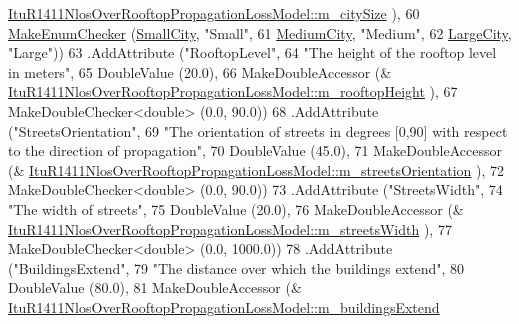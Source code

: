 \begin{DoxyCode}
      \hyperlink{classns3_1_1ItuR1411NlosOverRooftopPropagationLossModel_a875ce5ba78aa17e94efc01cc4290e299}{ItuR1411NlosOverRooftopPropagationLossModel::m\_citySize}
      ),
60                    \hyperlink{namespacens3_a48832781a2b521d3d0091e05ece30615}{MakeEnumChecker} (\hyperlink{group__propagation_gga29c9a1b1a58b6a56054ff5ea4c5a574dad3f856f2f166ae12798befabfbd2c99e}{SmallCity}, \textcolor{stringliteral}{"Small"},
61                                     \hyperlink{group__propagation_gga29c9a1b1a58b6a56054ff5ea4c5a574dad922b499b70e978a03d2230093e4aacd}{MediumCity}, \textcolor{stringliteral}{"Medium"},
62                                     \hyperlink{group__propagation_gga29c9a1b1a58b6a56054ff5ea4c5a574da017d6be2af0a102a6147e6519d63f54c}{LargeCity}, \textcolor{stringliteral}{"Large"}))
63     .AddAttribute (\textcolor{stringliteral}{"RooftopLevel"},
64                    \textcolor{stringliteral}{"The height of the rooftop level in meters"},
65                    DoubleValue (20.0),
66                    MakeDoubleAccessor (&
      \hyperlink{classns3_1_1ItuR1411NlosOverRooftopPropagationLossModel_a89f418813f34698cfbe4b0b67f01656d}{ItuR1411NlosOverRooftopPropagationLossModel::m\_rooftopHeight}
      ),
67                    MakeDoubleChecker<double> (0.0, 90.0))
68     .AddAttribute (\textcolor{stringliteral}{"StreetsOrientation"},
69                    \textcolor{stringliteral}{"The orientation of streets in degrees [0,90] with respect to the direction of
       propagation"},
70                    DoubleValue (45.0),
71                    MakeDoubleAccessor (&
      \hyperlink{classns3_1_1ItuR1411NlosOverRooftopPropagationLossModel_afe49e3b96fa44206627dc5bd6f5cb80f}{ItuR1411NlosOverRooftopPropagationLossModel::m\_streetsOrientation}
      ),
72                    MakeDoubleChecker<double> (0.0, 90.0))
73     .AddAttribute (\textcolor{stringliteral}{"StreetsWidth"},
74                    \textcolor{stringliteral}{"The width of streets"},
75                    DoubleValue (20.0),
76                    MakeDoubleAccessor (&
      \hyperlink{classns3_1_1ItuR1411NlosOverRooftopPropagationLossModel_a7d7efdcbb1640cfa92fb2503722b5981}{ItuR1411NlosOverRooftopPropagationLossModel::m\_streetsWidth}
      ),
77                    MakeDoubleChecker<double> (0.0, 1000.0))
78     .AddAttribute (\textcolor{stringliteral}{"BuildingsExtend"},
79                    \textcolor{stringliteral}{"The distance over which the buildings extend"},
80                    DoubleValue (80.0),
81                    MakeDoubleAccessor (&
      \hyperlink{classns3_1_1ItuR1411NlosOverRooftopPropagationLossModel_a4149a57bc530ce41fa79a6df4a6c97bb}{ItuR1411NlosOverRooftopPropagationLossModel::m\_buildingsExtend}

\end{DoxyCode}
